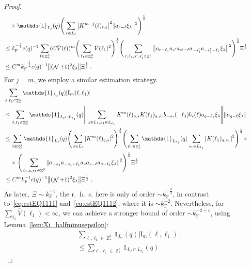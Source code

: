 \documentclass[12pt,a4paper]{article}
\numberwithin{equation}{section}
\newcommand{\1}{\mathbb{I}}
\newcommand{\F}{\mathrm{F}}
\newcommand{\I}{\mathrm{I}}
\DeclareMathOperator{\Z}{\mathbb{Z}}
\DeclareMathOperator{\NN}{\mathcal{N}}
\newcommand{\half}{\frac{1}{2}}
\theoremstyle{plain}
\theoremstyle{definition}
\theoremstyle{remark}
\theoremstyle{plain}
\theoremstyle{definition}
\theoremstyle{remark}
\begin{document}
\begin{proof}
{\begin{align}
	&\quad \times \mathds{1}_{L_\ell}(q) \Bigg( \sum\limits_{r\in L_{\ell}} \abs{K^{m-j}(\ell)_{r,q}}^2 \norm{a_{r-\ell} \xi_\lambda }^2 \Bigg)^\half\nonumber\\
	&\leq k_{\F}^{-\frac 32} e(q)^{-1}
		\sum_{\ell \in \Z^3_*} (C \hat{V}(\ell))^m
		\Bigg( \sum_{\ell_1 \in \Z^3_*} \hat{V}(\ell_1)^2 \Bigg)^{\half} 
		\Bigg( \sum\limits_{r,\ell_1,s',s_1' \in \Z^3} \norm{a_{r-\ell_1} a_{s'} a_{s'-\ell} a_{-s_1'} a_{-s_1'+\ell_1} \xi_\lambda}^2 \Bigg)^\half
		\Xi^\half \nonumber\\
	&\leq C^m k_{\F}^{-\frac 32} e(q)^{-1}
		\norm{(\NN+1)^2 \xi_\lambda} \Xi^\half \;. \label{eq:estEQ1112}
\end{align}
}
For $ j = m $, we employ a similar estimation strategy.
\textcolor{green!30!black}{
\begin{align}
	& \sum_{\ell,\ell_1 \in \Z^3_*} \mathds{1}_{L_\ell}(q) |\I_m(\ell, \ell_1)| \nonumber\\
	&\leq \sum_{\ell,\ell_1 \in \Z^3_*} \mathds{1}_{L_\ell \cap L_{\ell_1}}(q)
		\Bigg\Vert \sum\limits_{s\in L_{\ell}, s_1 \in L_{\ell_1}} K^m(\ell)_{q,s}K(\ell_1)_{q,s_1} b_{-s_1}(-\ell_1) b_{s}(\ell) a_{q-\ell_1}\xi_\lambda \Bigg\Vert
		\norm{ a_{q-\ell}\xi_\lambda }\nonumber\\
	&\leq \sum_{\ell \in \Z^3_*} \mathds{1}_{L_\ell}(q) \Bigg(\sum\limits_{s \in L_{\ell}} \abs{K^m(\ell)_{q,s}}^2\Bigg)^\half 
		\Bigg(\sum_{\ell_1 \in \Z^3_*} \mathds{1}_{L_{\ell_1}}(q) \sum\limits_{s_1 \in L_{\ell_1}} \abs{K(\ell_1)_{q,s_1}}^2\Bigg)^\half \times \nonumber\\
	&\quad \times \Bigg( \sum_{\ell_1, s, s_1 \in \Z^3} \norm{ a_{-s_1} a_{-s_1+\ell_1} a_s a_{s-\ell} a_{q-\ell_1} \xi_\lambda}^2 \Bigg)^{\half} \Xi^\half \nonumber\\
	&\leq C^m k_{\F}^{-1} e(q)^{-1} \norm{ (\NN+1)^2 \xi_\lambda}\Xi^\half \;. \label{eq:estEQ1113_Coulomb}
\end{align}
As later, $ \Xi \sim k_{\F}^{-1} $, the r.~h.~s. here is only of order $ \sim k_{\F}^{-\frac 32} $, in contrast to~\eqref{eq:estEQ1111} and~\eqref{eq:estEQ1112}, where it is $ \sim k_{\F}^{-2} $. Nevertheless, for $ \sum_{\ell_1} \hat{V}(\ell_1) < \infty $, we can achieve a stronger bound of order $ \sim k_{\F}^{-2 + \varepsilon} $, using Lemma~\ref{lem:Xi_halfminusepsilon}:
\begin{align}
	&\sum_{\ell,\ell_1 \in \Z^3_*} \mathds{1}_{L_\ell}(q) |\I_m(\ell, \ell_1)|\nonumber\\
	&\leq \sum_{\ell,\ell_1 \in \Z^3_*} \mathds{1}_{L_\ell \cap L_{\ell_1}}(q)

\end{align}}
\end{proof}
\end{document}
